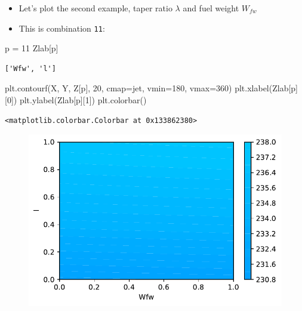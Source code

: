 \documentclass[
  letterpaper,
  DIV=11,
  numbers=noendperiod]{scrreprt}
\newenvironment{Shaded}{\begin{snugshade}}{\end{snugshade}}
\newcommand{\DecValTok}[1]{\textcolor[rgb]{0.68,0.00,0.00}{#1}}
\newcommand{\NormalTok}[1]{\textcolor[rgb]{0.00,0.23,0.31}{#1}}
\newcommand{\OperatorTok}[1]{\textcolor[rgb]{0.37,0.37,0.37}{#1}}
\newcommand{\StringTok}[1]{\textcolor[rgb]{0.13,0.47,0.30}{#1}}
\providecommand{\tightlist}{%
  \setlength{\itemsep}{0pt}\setlength{\parskip}{0pt}}\usepackage{longtable,booktabs,array}
\begin{document}
\begin{itemize}
\tightlist
\item
  Let's plot the second example, taper ratio \(\lambda\) and fuel weight
  \(W_{fw}\)
\item
  This is combination \texttt{11}:
\end{itemize}

\begin{Shaded}
\begin{Highlighting}[]
\NormalTok{p }\OperatorTok{=} \DecValTok{11}
\NormalTok{Zlab[p]}
\end{Highlighting}
\end{Shaded}

\begin{verbatim}
['Wfw', 'l']
\end{verbatim}

\begin{Shaded}
\begin{Highlighting}[]
\NormalTok{plt.contourf(X, Y, Z[p], }\DecValTok{20}\NormalTok{, cmap}\OperatorTok{=}\StringTok{\textquotesingle{}jet\textquotesingle{}}\NormalTok{, vmin}\OperatorTok{=}\DecValTok{180}\NormalTok{, vmax}\OperatorTok{=}\DecValTok{360}\NormalTok{)}
\NormalTok{plt.xlabel(Zlab[p][}\DecValTok{0}\NormalTok{])}
\NormalTok{plt.ylabel(Zlab[p][}\DecValTok{1}\NormalTok{])}
\NormalTok{plt.colorbar()}
\end{Highlighting}
\end{Shaded}

\begin{verbatim}
<matplotlib.colorbar.Colorbar at 0x133862380>
\end{verbatim}

\begin{figure}[H]

{\centering \includegraphics{002_awwe_files/figure-pdf/cell-13-output-2.pdf}

}

\end{figure}
\end{document}
